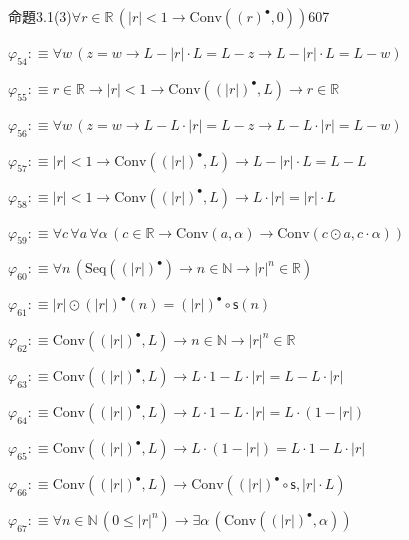 \begin{fullproof}{命題3.1(3)}{$\forall r \in \mathbb{R}\,(\lvert r \rvert < 1 \to \mathrm{Conv}({(r)^{\bullet}},0))$}{607}
\begin{abbrevlist}
\item $\varphi_{54} :\equiv \forall w\,(z = w \to L - \lvert r \rvert \cdot L = L - z \to L - \lvert r \rvert \cdot L = L - w)$
\item $\varphi_{55} :\equiv r \in \mathbb{R} \to \lvert r \rvert < 1 \to \mathrm{Conv}({(\lvert r \rvert)^{\bullet}},L) \to r \in \mathbb{R}$
\item $\varphi_{56} :\equiv \forall w\,(z = w \to L - L \cdot \lvert r \rvert = L - z \to L - L \cdot \lvert r \rvert = L - w)$
\item $\varphi_{57} :\equiv \lvert r \rvert < 1 \to \mathrm{Conv}({(\lvert r \rvert)^{\bullet}},L) \to L - \lvert r \rvert \cdot L = L - L$
\item $\varphi_{58} :\equiv \lvert r \rvert < 1 \to \mathrm{Conv}({(\lvert r \rvert)^{\bullet}},L) \to L \cdot \lvert r \rvert = \lvert r \rvert \cdot L$
\item $\varphi_{59} :\equiv \forall c\,\forall a\,\forall \alpha\,(c \in \mathbb{R} \to \mathrm{Conv}(a,\alpha) \to \mathrm{Conv}(c \odot a,c \cdot \alpha))$
\item $\varphi_{60} :\equiv \forall n\,(\mathrm{Seq}({(\lvert r \rvert)^{\bullet}}) \to n \in \mathbb{N} \to {{\lvert r \rvert}^{n}} \in \mathbb{R})$
\item $\varphi_{61} :\equiv \lvert r \rvert \odot {(\lvert r \rvert)^{\bullet}}(n) = {(\lvert r \rvert)^{\bullet}} \circ \mathsf{s}(n)$
\item $\varphi_{62} :\equiv \mathrm{Conv}({(\lvert r \rvert)^{\bullet}},L) \to n \in \mathbb{N} \to {{\lvert r \rvert}^{n}} \in \mathbb{R}$
\item $\varphi_{63} :\equiv \mathrm{Conv}({(\lvert r \rvert)^{\bullet}},L) \to L \cdot 1 - L \cdot \lvert r \rvert = L - L \cdot \lvert r \rvert$
\item $\varphi_{64} :\equiv \mathrm{Conv}({(\lvert r \rvert)^{\bullet}},L) \to L \cdot 1 - L \cdot \lvert r \rvert = L \cdot (1 - \lvert r \rvert)$
\item $\varphi_{65} :\equiv \mathrm{Conv}({(\lvert r \rvert)^{\bullet}},L) \to L \cdot (1 - \lvert r \rvert) = L \cdot 1 - L \cdot \lvert r \rvert$
\item $\varphi_{66} :\equiv \mathrm{Conv}({(\lvert r \rvert)^{\bullet}},L) \to \mathrm{Conv}({(\lvert r \rvert)^{\bullet}} \circ \mathsf{s},\lvert r \rvert \cdot L)$
\item $\varphi_{67} :\equiv \forall n \in \mathbb{N}\,(0 \leq {{\lvert r \rvert}^{n}}) \to \exists \alpha\,(\mathrm{Conv}({(\lvert r \rvert)^{\bullet}},\alpha))$

\end{abbrevlist}
\end{fullproof}
